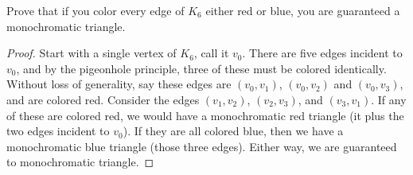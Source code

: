 \begin{questions}
\question Prove that if you color every edge of $K_6$ either red or blue, you are guaranteed a monochromatic triangle.

	\begin{answer}
		\begin{proof}
		Start with a single vertex of $K_6$, call it $v_0$.  There are five edges incident to $v_0$, and by the pigeonhole principle, three of these must be colored identically.  Without loss of generality, say these edges are $(v_0, v_1)$, $(v_0, v_2)$ and $(v_0,v_3)$, and are colored red.  Consider the edges $(v_1,v_2)$, $(v_2,v_3)$, and $(v_3, v_1)$.  If any of these are colored red, we would have a monochromatic red triangle (it plus the two edges incident to $v_0$).  If they are all colored blue, then we have a monochromatic blue triangle (those three edges).  Either way, we are guaranteed to monochromatic triangle.
		
		\end{proof}
	\end{answer}	

\end{questions}